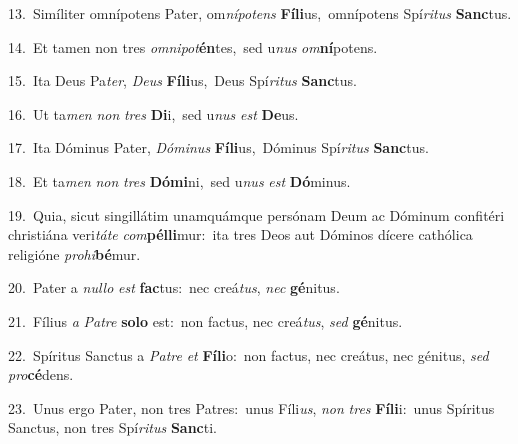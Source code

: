 {\numbfont\textcolor{\numbcolor}{13.}}~Simíliter omnípotens Pater, om\-\textit{ní}\-\textit{pot}\textit{ens} \textbf{Fí}\-\textbf{li}us,~\star omnípotens Spí\-\textit{ri}\-\textit{tus} \textbf{Sanc}\-tus.\par
{\numbfont\textcolor{\numbcolor}{14.}}~Et tamen non tres \textit{om}\-\textit{ni}\textit{pot}\textbf{én}tes,~\star sed u\textit{nus} \textit{om}\-\textbf{ní}potens.\par
{\numbfont\textcolor{\numbcolor}{15.}}~Ita Deus Pa\-\textit{ter}\-, \textit{De}\-\textit{us} \textbf{Fí}\-\textbf{li}us,~\star Deus Spí\-\textit{ri}\-\textit{tus} \textbf{Sanc}\-tus.\par
{\numbfont\textcolor{\numbcolor}{16.}}~Ut ta\textit{men} \textit{non} \textit{tres} \textbf{Di}\-i,~\star sed u\textit{nus} \textit{est} \textbf{De}\-us.\par
{\numbfont\textcolor{\numbcolor}{17.}}~Ita Dóminus Pater, \textit{Dó}\-\textit{mi}\textit{nus} \textbf{Fí}\-\textbf{li}us,~\star Dóminus Spí\-\textit{ri}\-\textit{tus} \textbf{Sanc}\-tus.\par
{\numbfont\textcolor{\numbcolor}{18.}}~Et ta\textit{men} \textit{non} \textit{tres} \textbf{Dó}\-\textbf{mi}ni,~\star sed u\textit{nus} \textit{est} \textbf{Dó}\-minus.\par
{\numbfont\textcolor{\numbcolor}{19.}}~Quia, sicut singillátim unamquámque persónam Deum ac Dóminum confitéri christiána veri\-\textit{tá}\-\textit{te} \textit{com}\-\textbf{pél}\textbf{li}mur:~\star ita tres Deos aut Dóminos dícere cathólica religióne \textit{pro}\-\textit{hi}\textbf{bé}mur.\par
{\numbfont\textcolor{\numbcolor}{20.}}~Pater a \textit{nul}\-\textit{lo} \textit{est} \textbf{fac}\-tus:~\star nec creá\-\textit{tus}\-, \textit{nec} \textbf{gé}\-nitus.\par
{\numbfont\textcolor{\numbcolor}{21.}}~Fílius \textit{a} \textit{Pa}\-\textit{tre} \textbf{so}\-\textbf{lo} est:~\star non factus, nec creá\-\textit{tus}\-, \textit{sed} \textbf{gé}\-nitus.\par
{\numbfont\textcolor{\numbcolor}{22.}}~Spíritus Sanctus a \textit{Pa}\-\textit{tre} \textit{et} \textbf{Fí}\-\textbf{li}o:~\star non factus, nec creátus, nec génitus, \textit{sed} \textit{pro}\-\textbf{cé}dens.\par
{\numbfont\textcolor{\numbcolor}{23.}}~Unus ergo Pater, non tres Patres:~\dagger unus Fíli\-\textit{us}\-, \textit{non} \textit{tres} \textbf{Fí}\-\textbf{li}i:~\star unus Spíritus Sanctus, non tres Spí\-\textit{ri}\-\textit{tus} \textbf{Sanc}\-ti.\par
